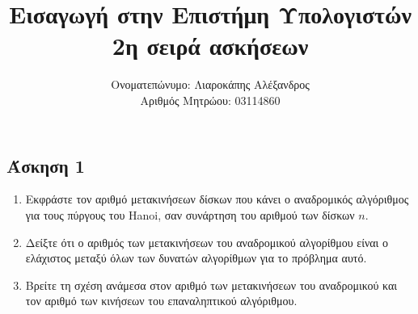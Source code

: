 \documentclass[12pt]{report}
\title{Εισαγωγή στην Επιστήμη Υπολογιστών\\
       {\Large 2η σειρά ασκήσεων}}
\author{Ονοματεπώνυμο: Λιαροκάπης Αλέξανδρος \\
        Αριθμός Μητρώου: 03114860}
\date{}
\newcommand{\en}[1]{\textlatin{#1}}
\begin{document}
\maketitle

\newpage\subsection*{Άσκηση 1}
\begin{enumerate}
\item
Εκφράστε τον αριθμό μετακινήσεων δίσκων που κάνει ο αναδρομικός αλγόριθμος 
για τους πύργους του \en{Hanoi}, σαν συνάρτηση του αριθμού των δίσκων $n$.
\item
Δείξτε ότι ο αριθμός των μετακινήσεων του αναδρομικού αλγορίθμου είναι
ο ελάχιστος μεταξύ όλων των δυνατών αλγορίθμων για το πρόβλημα αυτό.
\item
Βρείτε τη σχέση ανάμεσα στον αριθμό των μετακινήσεων του αναδρομικού και
τον αριθμό των κινήσεων του επαναληπτικού αλγόριθμου.
\end{enumerate}
\end{document}
